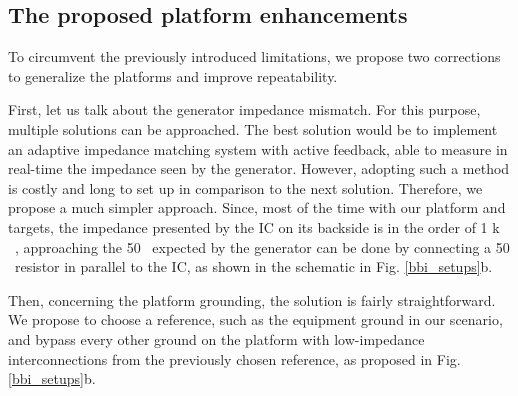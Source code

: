 	\subsection{The proposed platform enhancements}
		To circumvent the previously introduced limitations, we propose two corrections to generalize the platforms and improve repeatability.

		First, let us talk about the generator impedance mismatch.
		For this purpose, multiple solutions can be approached.
		The best solution would be to implement an adaptive impedance matching system with active feedback, able to measure in real-time the impedance seen by the generator.
		However, adopting such a method is costly and long to set up in comparison to the next solution.
		Therefore, we propose a much simpler approach.
		Since, most of the time with our platform and targets, the impedance presented by the IC on its backside is in the order of 1 k \textOmega\ \cite{mybbifdtc2023}, approaching the 50 \textOmega\ expected by the generator can be done by connecting a 50 \textOmega\ resistor in parallel to the IC, as shown in the schematic in Fig. \ref{bbi_setups}b.
		
		Then, concerning the platform grounding, the solution is fairly straightforward.
		We propose to choose a reference, such as the equipment ground in our scenario, and bypass every other ground on the platform with low-impedance interconnections from the previously chosen reference, as proposed in Fig. \ref{bbi_setups}b.

%

